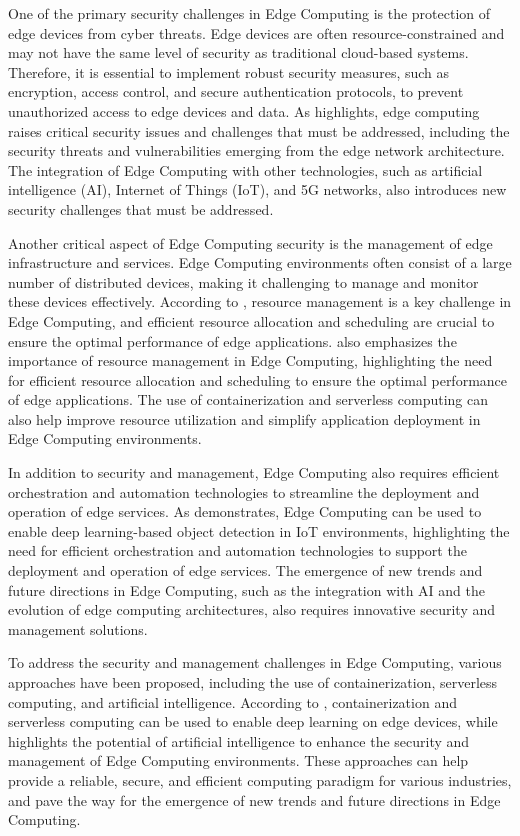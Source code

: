 \documentclass[11pt,a4paper]{article}
\begin{document}
One of the primary security challenges in Edge Computing is the protection of edge devices from cyber threats. Edge devices are often resource-constrained and may not have the same level of security as traditional cloud-based systems. Therefore, it is essential to implement robust security measures, such as encryption, access control, and secure authentication protocols, to prevent unauthorized access to edge devices and data. As \cite{arxiv:2206.07164} highlights, edge computing raises critical security issues and challenges that must be addressed, including the security threats and vulnerabilities emerging from the edge network architecture. The integration of Edge Computing with other technologies, such as artificial intelligence (AI), Internet of Things (IoT), and 5G networks, also introduces new security challenges that must be addressed.

Another critical aspect of Edge Computing security is the management of edge infrastructure and services. Edge Computing environments often consist of a large number of distributed devices, making it challenging to manage and monitor these devices effectively. According to \cite{arxiv:1810.00305}, resource management is a key challenge in Edge Computing, and efficient resource allocation and scheduling are crucial to ensure the optimal performance of edge applications. \cite{arxiv:1911.02794} also emphasizes the importance of resource management in Edge Computing, highlighting the need for efficient resource allocation and scheduling to ensure the optimal performance of edge applications. The use of containerization and serverless computing can also help improve resource utilization and simplify application deployment in Edge Computing environments.

In addition to security and management, Edge Computing also requires efficient orchestration and automation technologies to streamline the deployment and operation of edge services. As \cite{arxiv:1906.11056} demonstrates, Edge Computing can be used to enable deep learning-based object detection in IoT environments, highlighting the need for efficient orchestration and automation technologies to support the deployment and operation of edge services. The emergence of new trends and future directions in Edge Computing, such as the integration with AI and the evolution of edge computing architectures, also requires innovative security and management solutions.

To address the security and management challenges in Edge Computing, various approaches have been proposed, including the use of containerization, serverless computing, and artificial intelligence. According to \cite{arxiv:2210.03204}, containerization and serverless computing can be used to enable deep learning on edge devices, while \cite{arxiv:2012.05410} highlights the potential of artificial intelligence to enhance the security and management of Edge Computing environments. These approaches can help provide a reliable, secure, and efficient computing paradigm for various industries, and pave the way for the emergence of new trends and future directions in Edge Computing.
\end{document}

